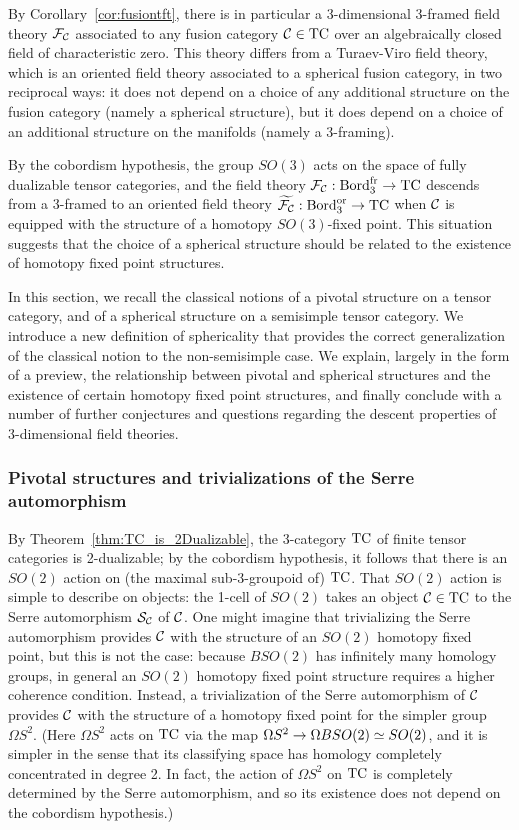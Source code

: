 \documentclass{amsart}
\begin{document}
By Corollary~\ref{cor:fusiontft}, there is in particular a 3-dimensional 3-framed field theory $\mathcal F_\mathcal C$ associated to any fusion category $\mathcal C\in \mathrm{TC}$ over an algebraically closed field of characteristic zero.  This theory differs from a Turaev-Viro field theory, which is an oriented field theory associated to a spherical fusion category, in two reciprocal ways: it does not depend on a choice of any additional structure on the fusion category (namely a spherical structure), but it does depend on a choice of an additional structure on the manifolds (namely a 3-framing).  

By the cobordism hypothesis, the group $SO(3)$ acts on the space of fully dualizable tensor categories, and the field theory $\mathcal F_\mathcal C : \mathrm{Bord}^\mathrm{fr}_3 \rightarrow \mathrm{TC}$ descends from a 3-framed to an oriented field theory $\widetilde{\mathcal F_\mathcal C} : \mathrm{Bord}^\mathrm{or}_3 \rightarrow \mathrm{TC}$ when $\mathcal C$ is equipped with the structure of a homotopy $SO(3)$-fixed point.  This situation suggests that the choice of a spherical structure should be related to the existence of homotopy fixed point structures.  

In this section, we recall the classical notions of a pivotal structure on a tensor category, and of a spherical structure on a semisimple tensor category.  We introduce a new definition of sphericality that provides the correct generalization of the classical notion to the non-semisimple case.  We explain, largely in the form of a preview, the relationship between pivotal and spherical structures and the existence of certain homotopy fixed point structures, and finally conclude with a number of further conjectures and questions regarding the descent properties of 3-dimensional field theories.




\subsubsection{Pivotal structures and trivializations of the Serre automorphism}

By Theorem~\ref{thm:TC_is_2Dualizable}, the 3-category $\mathrm{TC}$ of finite tensor categories is 2-dualizable; by the cobordism hypothesis, it follows that there is an $SO(2)$ action on (the maximal sub-3-groupoid of) $\mathrm{TC}$.  That $SO(2)$ action is simple to describe on objects: the 1-cell of $SO(2)$ takes an object $\mathcal C \in \mathrm{TC}$ to the Serre automorphism $\mathcal S_\mathcal C$ of $\mathcal C$.  One might imagine that trivializing the Serre automorphism provides $\mathcal C$ with the structure of an $SO(2)$ homotopy fixed point, but this is not the case: because $BSO(2)$ has infinitely many homology groups, in general an $SO(2)$ homotopy fixed point structure requires a higher coherence condition.  Instead, a trivialization of the Serre automorphism of $\mathcal C$ provides $\mathcal C$ with the structure of a homotopy fixed point for the simpler group $\Omega S^2$.  (Here $\Omega S^2$ acts on $\mathrm{TC}$ via the map $\Omega S^2 \rightarrow \Omega B SO(2) \simeq SO(2)$, and it is simpler in the sense that its classifying space has homology completely concentrated in degree 2.  In fact, the action of $\Omega S^2$ on $\mathrm{TC}$ is completely determined by the Serre automorphism, and so its existence does not depend on the cobordism hypothesis.)
\end{document}
